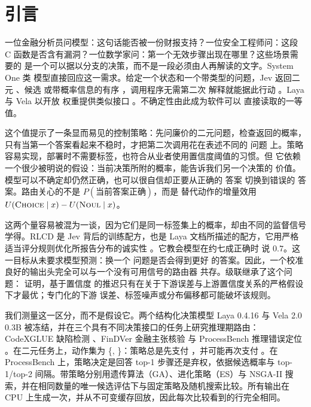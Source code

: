 \section{引言}

一位金融分析员问模型：这句话能否被一份财报支持？一位安全工程师问：这段 C
函数是否含有漏洞？一位数学家问：第一个无效步骤出现在哪里？这些场景需要的
是一个可以据以分支的决策，而不是一段必须由人再解读的文字。System One 类
模型直接回应这一需求。给定一个状态和一个带类型的问题，Jev 返回二元
\noul{}、候选 \choice{} 或带概率信息的有序 \score{}，调用程序无需第二次
解释就能据此行动 \citep{typesafe2026,deusser2026jev}。Laya 与 Vela 以开放
权重提供类似接口 \citep{laya2026,vllm2026vela}。不确定性由此成为软件可以
直接读取的一等值。

这个值提示了一条显而易见的控制策略：先问廉价的二元问题，检查返回的概率，
只有当第一个答案看起来不稳时，才把第二次调用花在表述不同的 \choice{} 问题
上。策略容易实现，部署时不需要标签，也符合从业者使用置信度阈值的习惯。但
它依赖一个很少被明说的假设：当前决策所附的概率，能告诉我们另一个决策的
价值。模型可以不确定却仍然正确，也可以很自信却正要从正确的 \noul{} 答案
切换到错误的 \choice{} 答案。路由关心的不是 $P(\text{当前答案正确})$，而是
替代动作的增量效用 $U(\textsc{Choice}\mid x)-U(\textsc{Noul}\mid x)$。

这两个量容易被混为一谈，因为它们是同一标签集上的概率，却由不同的监督信号
学得。RLCD 是 Jev 背后的训练配方，也是 Laya 文档所描述的配方，它用严格
适当评分规则优化所报告分布的诚实性
\citep{typesafe2026,laya2026,gneiting2007scoring}。它教会模型在约七成正确时
说 $0.7$。这一目标从未要求模型预测：换一个 \choice{} 问题是否会得到更好
的答案。因此，一个校准良好的输出头完全可以与一个没有可用信号的路由器
共存。级联继承了这个问题：\citet{jitkrittum2023cascade} 证明，基于置信度
的推迟只有在关于下游误差与上游置信度关系的严格假设下才最优；专门化的下游
误差、标签噪声或分布偏移都可能破坏该规则。

我们测量这一区分，而不是假设它。两个结构化决策模型 Laya 0.4.16 与 Vela 2.0
0.3B 被冻结，并在三个具有不同决策接口的任务上研究推理期路由：CodeXGLUE
缺陷检测 \citep{lu2021codexglue}、FinDVer 金融主张核验
\citep{zhao2024findver} 与 ProcessBench 推理错误定位
\citep{zheng2025processbench}。在二元任务上，动作集为
\{\noul, \choice\}：策略总是先支付 \noul{}，并可能再次支付 \choice{}。在
ProcessBench 上，策略决定是回答 top-1 步骤还是弃权，依据候选概率与
top-1/top-2 间隔。带策略分别用遗传算法（GA）、进化策略（ES）与 NSGA-II
搜索，并在相同数量的唯一候选评估下与固定策略及随机搜索比较。所有输出在
CPU 上生成一次，并从不可变缓存回放，因此每次比较看到的行完全相同。

